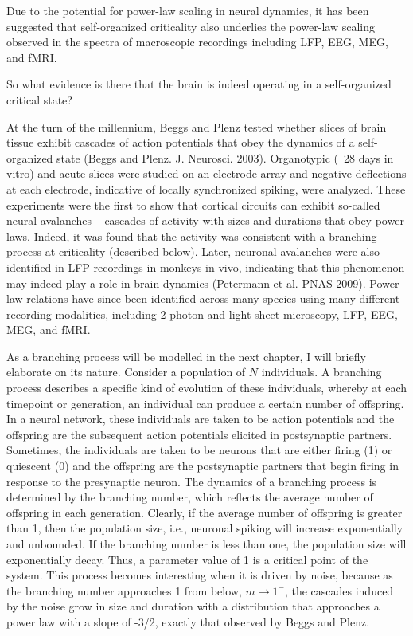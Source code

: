 Due to the potential for power-law scaling in neural dynamics, it has been suggested that self-organized criticality also underlies the power-law scaling observed in the spectra of macroscopic recordings including LFP, EEG, MEG, and fMRI. 

So what evidence is there that the brain is indeed operating in a self-organized critical state?

At the turn of the millennium, Beggs and Plenz tested whether slices of brain tissue exhibit cascades of action potentials that obey the dynamics of a self-organized state (Beggs and Plenz. J. Neurosci. 2003). Organotypic (~28 days in vitro) and acute slices were studied on an electrode array and negative deflections at each electrode, indicative of locally synchronized spiking, were analyzed. These experiments were the first to show that cortical circuits can exhibit so-called neural avalanches – cascades of activity with sizes and durations that obey power laws. Indeed, it was found that the activity was consistent with a branching process at criticality (described below). Later, neuronal avalanches were also identified in LFP recordings in monkeys in vivo, indicating that this phenomenon may indeed play a role in brain dynamics (Petermann et al. PNAS 2009). Power-law relations have since been identified across many species using many different recording modalities, including 2-photon and light-sheet microscopy, LFP, EEG, MEG, and fMRI.

As a branching process will be modelled in the next chapter, I will briefly elaborate on its nature. Consider a population of $N$ individuals. A branching process describes a specific kind of evolution of these individuals, whereby at each timepoint or generation, an individual can produce a certain number of offspring. In a neural network, these individuals are taken to be action potentials and the offspring are the subsequent action potentials elicited in postsynaptic partners. Sometimes, the individuals are taken to be neurons that are either firing (1) or quiescent (0) and the offspring are the postsynaptic partners that begin firing in response to the presynaptic neuron. The dynamics of a branching process is determined by the branching number, which reflects the average number of offspring in each generation. Clearly, if the average number of offspring is greater than 1, then the population size, i.e., neuronal spiking will increase exponentially and unbounded. If the branching number is less than one, the population size will exponentially decay. Thus, a parameter value of 1 is a critical point of the system. This process becomes interesting when it is driven by noise, because as the branching number approaches 1 from below, $m\rightarrow1^{-}$, the cascades induced by the noise grow in size and duration with a distribution that approaches a power law with a slope of -3/2, exactly that observed by Beggs and Plenz.


